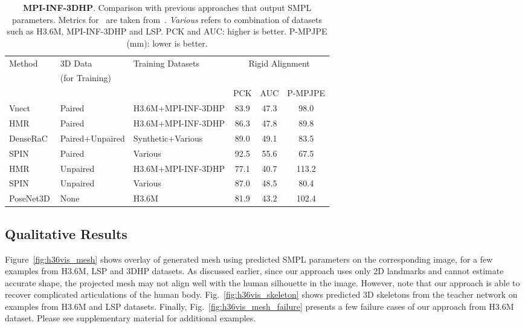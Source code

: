 \documentclass[10pt,twocolumn,letterpaper]{article}
\begin{document}
\begin{table}[tb!]
	\centering
	\begin{adjustbox}{max width=0.99\linewidth}
		\begin{tabular}{lllccc}\toprule
			Method & 3D Data & Training Datasets & \multicolumn{3}{c}{Rigid Alignment}  \\
						& (for Training) &  & & &  \\
			& & & PCK & AUC & P-MPJPE \\
			\midrule 
     		Vnect~\cite{mehta2017vnect} & Paired & H3.6M+MPI-INF-3DHP & 83.9 & 47.3 & 98.0 \\
			HMR~\cite{kanazawa2018end} & Paired & H3.6M+MPI-INF-3DHP & 86.3 & 47.8 & 89.8\\
			DenseRaC~\cite{xu2019denserac} &  Paired+Unpaired & Synthetic+Various & 89.0 & 49.1  & 83.5\\
			SPIN~\cite{SPIN_ICCV2019} &  Paired & Various & 92.5 & 55.6 & 67.5\\

			\midrule
			 HMR~\cite{kanazawa2018end}& Unpaired & H3.6M+MPI-INF-3DHP & 77.1 & 40.7 & 113.2\\ 
			SPIN~\cite{SPIN_ICCV2019} & Unpaired & Various & {87.0} & {48.5} & {80.4 } \\ 
			\midrule
			PoseNet3D & None & H3.6M & {81.9} & {43.2} & {102.4}\\			
			\bottomrule
		\end{tabular}\end{adjustbox}
	\vspace{-1ex}
	\caption{\textbf{MPI-INF-3DHP}. Comparison with previous approaches that output SMPL parameters. Metrics for~\cite{kanazawa2018end,SPIN_ICCV2019,mehta2017vnect} are taken from~\cite{SPIN_ICCV2019}. \textit{Various} refers to combination of datasets such as H3.6M, MPI-INF-3DHP and LSP. PCK and AUC: higher is better. P-MPJPE (mm): lower  is better. }
	\vspace{-3ex}
	\label{table:MPI}
\end{table}   




 






\subsection{Qualitative Results}

Figure~\ref{fig:h36vis_mesh} shows overlay of generated mesh using predicted SMPL parameters on the corresponding image, for a few examples from H3.6M, LSP and 3DHP datasets. 
As discussed earlier, since our approach uses only 2D landmarks and cannot estimate accurate shape, the projected mesh may not align well with the human silhouette in the image. However, note that our approach is able to recover complicated articulations of the human body. Fig.~\ref{fig:h36vis_skeleton} shows predicted 3D skeletons from the teacher network on examples from H3.6M and LSP datasets. Finally, Fig.~\ref{fig:h36vis_mesh_failure} presents a few failure cases of our approach from H3.6M dataset. Please see supplementary material for additional examples.
\end{document}
